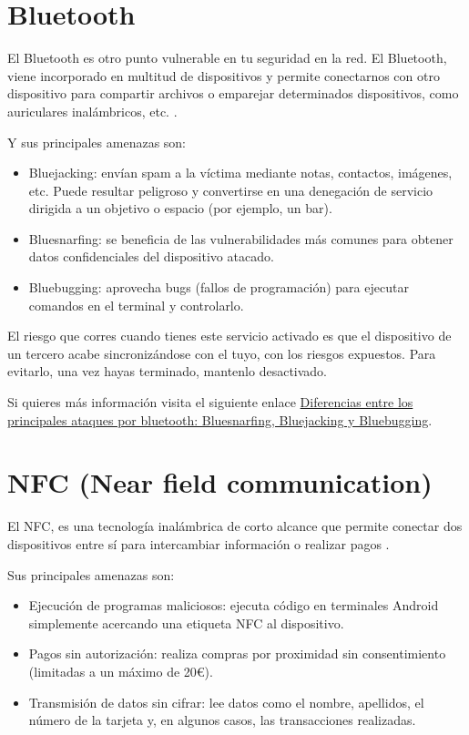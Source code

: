 \documentclass[
  a4paper,
  openany]{book}
\begin{document}
\hypertarget{bluetooth}{%
\section{Bluetooth}\label{bluetooth}}

El Bluetooth es otro punto vulnerable en tu seguridad en la red. El Bluetooth, viene incorporado en multitud de dispositivos y permite conectarnos con otro dispositivo para compartir archivos o emparejar determinados dispositivos, como auriculares inalámbricos, etc. \citep{IONOS-bluetooh}.

Y sus principales amenazas son:

\begin{itemize}
\item
  Bluejacking: envían spam a la víctima mediante notas, contactos, imágenes, etc. Puede resultar peligroso y convertirse en una denegación de servicio dirigida a un objetivo o espacio (por ejemplo, un bar).
\item
  Bluesnarfing: se beneficia de las vulnerabilidades más comunes para obtener datos confidenciales del dispositivo atacado.
\item
  Bluebugging: aprovecha bugs (fallos de programación) para ejecutar comandos en el terminal y controlarlo.
\end{itemize}

El riesgo que corres cuando tienes este servicio activado es que el dispositivo de un tercero acabe sincronizándose con el tuyo, con los riesgos expuestos. Para evitarlo, una vez hayas terminado, mantenlo desactivado.

Si quieres más información visita el siguiente enlace \href{https://computerhoy.com/noticias/tecnologia/diferencias-principales-ataques-bluetooth-bluesnarfing-bluejacking-bluebugging-1087867}{Diferencias entre los principales ataques por bluetooth: Bluesnarfing, Bluejacking y Bluebugging}.

\hypertarget{nfc-near-field-communication}{%
\section{NFC (Near field communication)}\label{nfc-near-field-communication}}

El NFC, es una tecnología inalámbrica de corto alcance que permite conectar dos dispositivos entre sí para intercambiar información o realizar pagos \citep{IONOS-nfc}.

Sus principales amenazas son:

\begin{itemize}
\item
  Ejecución de programas maliciosos: ejecuta código en terminales Android simplemente acercando una etiqueta NFC al dispositivo.
\item
  Pagos sin autorización: realiza compras por proximidad sin consentimiento (limitadas a un máximo de 20€).
\item
  Transmisión de datos sin cifrar: lee datos como el nombre, apellidos, el número de la tarjeta y, en algunos casos, las transacciones realizadas.
\end{itemize}
\end{document}
